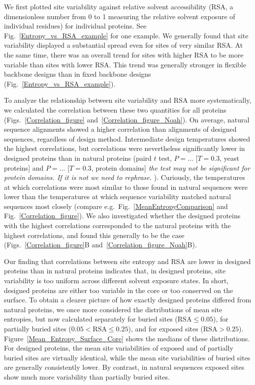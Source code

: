 \documentclass[12pt]{article}
\begin{document}
We first plotted site variability against relative solvent accessibility (RSA, a dimensionless number from 0 to 1 measuring the relative solvent exposure of individual residues) for individual proteins. See Fig.~\ref{Entropy_vs_RSA_example} for one example. We generally found that site variability displayed a substantial spread even for sites of very similar RSA. At the same time, there was an overall trend for sites with higher RSA to be more variable than sites with lower RSA. This trend was generally stronger in flexible backbone designs than in fixed backbone designs (Fig.~\ref{Entropy_vs_RSA_example}).

To analyze the relationship between site variability and RSA more systematically, we calculated the correlation between these two quantities for all proteins (Figs.~\ref{Correlation_figure} and~\ref{Correlation_figure_Noah}). On average, natural sequence alignments showed a higher correlation than alignments of designed sequences, regardless of design method. Intermediate design temperatures showed the highest correlations, {\color{red}but correlations were nevertheless significantly lower in designed proteins than in natural proteins (paird $t$ test, $P=\dots$ [$T=0.3$, yeast proteins] and $P=\dots$ [$T=0.3$, protein domains] \emph{the test may not be significant for protein domains. If it is not we need to rephrase.} )}. Curiously, the temperatures at which correlations were most similar to those found in natural sequences were lower than the temperatures at which sequence variability matched natural sequences most closely (compare e.g.\ Fig.~\ref{MeanEntropyComparison} and Fig.~\ref{Correlation_figure}). We also investigated whether the designed proteins with the highest correlations corresponded to the natural proteins with the highest correlations, and found this generally to be the case (Figs.~\ref{Correlation_figure}B and~\ref{Correlation_figure_Noah}B).

Our finding that correlations between site entropy and RSA are lower in designed proteins than in natural proteins indicates that, in designed proteins, site variability is too uniform across different solvent exposure states. In short, designed proteins are either too variable in the core or too conserved on the surface. To obtain a clearer picture of how exactly designed proteins differed from natural proteins, we once more considered the distributions of mean site entropies, but now calculated separately for buried sites ($\text{RSA}\leq0.05$), for partially buried sites ($0.05<\text{RSA}\leq0.25$), and for exposed sites ($\text{RSA}>0.25$). Figure~\ref{Mean_Entropy_Surface_Core} shows the medians of these distributions. For designed proteins, the mean site variabilities of exposed and of partially buried sites are virtually identical, while the mean site variabilities of buried sites are generally consistently lower. By contrast, in natural sequences exposed sites show much more variability than partially buried sites.
\end{document}
